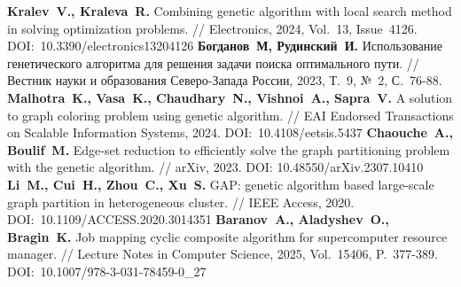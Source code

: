 \begin{thebibliography}{99}
%
\textbf{Kralev~V., Kraleva~R.} Combining genetic algorithm with local search method in solving optimization problems. // Electronics, 2024, Vol.~13, Issue~4126. DOI:~10.3390/electronics13204126
%
\textbf{Богданов~М, Рудинский~И.} Использование генетического алгоритма для решения задачи поиска оптимального пути. // Вестник науки и образования Северо-Запада России, 2023, Т.~9, №~2, С.~76-88.
%
\textbf{Malhotra~K., Vasa~K., Chaudhary~N., Vishnoi~A., Sapra~V.} A solution to graph coloring problem using genetic algorithm. // EAI Endorsed Transactions on Scalable Information Systems, 2024. DOI:~10.4108/eetsis.5437
%
\textbf{Chaouche~A., Boulif~M.} Edge-set reduction to efficiently solve the graph partitioning problem with the genetic algorithm. // arXiv, 2023. DOI: 10.48550/arXiv.2307.10410
%
\textbf{Li~M., Cui~H., Zhou~C., Xu~S.} GAP: genetic algorithm based large-scale graph partition in heterogeneous cluster. // IEEE Access, 2020. DOI:~10.1109/ACCESS.2020.3014351
%
\textbf{Baranov~A., Aladyshev~O., Bragin~K.} Job mapping cyclic composite algorithm for supercomputer resource manager. // Lecture Notes in Computer Science, 2025, Vol.~15406, P.~377-389. DOI:~10.1007/978-3-031-78459-0\_27
%



%
%


\end{thebibliography}

